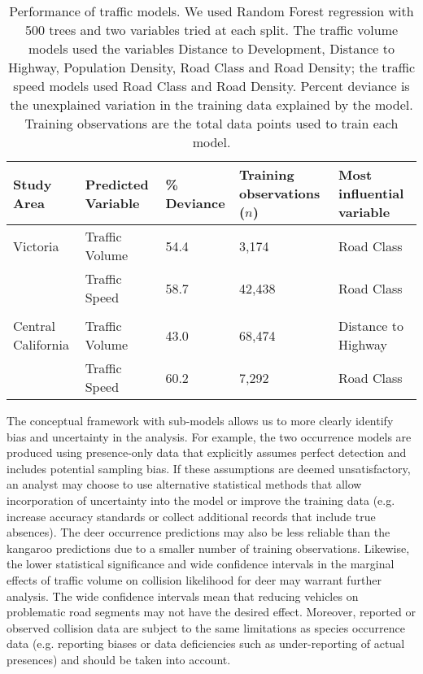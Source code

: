 \begin{table}[!t]
\caption[Performance of traffic models]{Performance of traffic models. We used Random Forest regression with 500 trees and two variables tried at each split. The traffic volume models used the variables Distance to Development, Distance to Highway, Population Density, Road Class and Road Density; the traffic speed models used Road Class and Road Density. Percent deviance is the unexplained variation in the training data explained by the model. Training observations are the total data points used to train each model.}
\centering
\begin{tabularx}{0.9\textwidth}{lllll} \toprule
Study Area         	&Predicted Variable	&\% Deviance 	& Training observations ($n$)	& Most influential variable \\ \midrule 
Victoria		 	& Traffic Volume	& 54.4 			& 3,174 						& Road Class \\ 
					& Traffic Speed		& 58.7			& 42,438 						& Road Class \\
&& \\ 
Central California	& Traffic Volume	& 43.0			& 68,474 						& Distance to Highway \\
			 		& Traffic Speed		& 60.2			& 7,292 						& Road Class \\
\bottomrule
\end{tabularx}
\label{cal_tmodel_perf}
\end{table}

The conceptual framework with sub-models allows us to more clearly identify bias and uncertainty in the analysis.  For example, the two occurrence models are produced using presence-only data that explicitly assumes perfect detection and includes potential sampling bias.  If these assumptions are deemed unsatisfactory, an analyst may choose to use alternative statistical methods that allow incorporation of uncertainty into the model \citep[see][]{dora14} or improve the training data (e.g. increase accuracy standards or collect additional records that include true absences).  The deer occurrence predictions may also be less reliable than the kangaroo predictions due to a smaller number of training observations.  Likewise, the lower statistical significance and wide confidence intervals in the marginal effects of traffic volume on collision likelihood for deer may warrant further analysis. The wide confidence intervals mean that reducing vehicles on problematic road segments may not have the desired effect.  Moreover, reported or observed collision data are subject to the same limitations as species occurrence data (e.g. reporting biases or data deficiencies such as under-reporting of actual presences) and should be taken into account.


